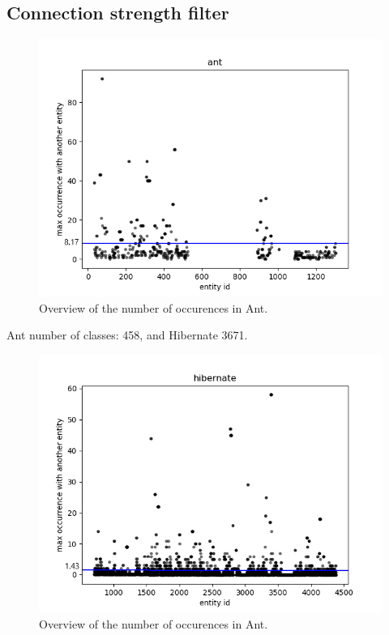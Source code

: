 \documentclass[runningheads]{comsis2}
\begin{document}
\subsection{Connection strength filter}

\begin{figure}
\centering
\includegraphics[width=\textwidth]{fig_ant_maxOcc.png}
\caption{Overview of the number of occurences in Ant. }
\label{fig:strength_overview}
\centering
\end{figure}

Ant number of classes: 458, and Hibernate 3671.

\begin{figure}
\centering
\includegraphics[width=\textwidth]{fig_hibernate_maxOcc.png}
\caption{Overview of the number of occurences in Ant. }
\label{fig:strength_overview}
\centering
\end{figure}
\end{document}
